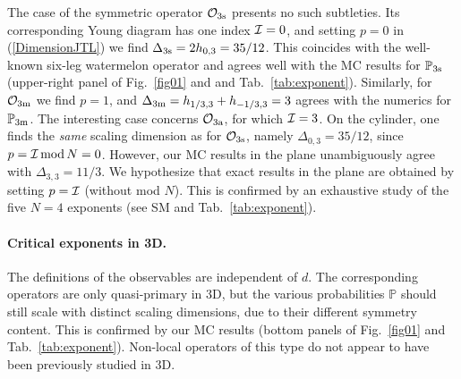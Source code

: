 \documentclass[aps,prl,twocolumn,showpacs,superscriptaddress,groupedaddress]{revtex4}  %
\def\bbp{{\mathbb P}}
\begin{document}
The case of the symmetric operator $\mathcal{O}_{3{\rm s}}$ presents no such subtleties.
Its corresponding Young diagram has one index ${\cal I} = 0$, and setting $p=0$ in (\ref{DimensionJTL}) we find $\Delta_{3{\rm s}}=2h_{0,3}=35/12$.
This coincides with the well-known six-leg watermelon operator \cite{SD87} and agrees well with the MC results for $\bbp_{3{\rm s}}$
(upper-right panel of Fig.~\eqref{fig01} and and Tab.~\ref{tab:exponent}).
Similarly, for $\mathcal{O}_{3{\rm m}}$ we find $p=1$, and $\Delta_{3{\rm m}}=h_{1/3,3}+h_{-1/3,3}=3$
agrees with the numerics for $\bbp_{3{\rm m}}$. The interesting case concerns $\mathcal{O}_{3{\rm a}}$, for which ${\cal I}=3$. 
On the cylinder, one finds the {\em same} scaling dimension as for $\mathcal{O}_{3{\rm s}}$, namely $\Delta_{0,3} = 35/12$,
since $p = {\cal I} \, \mbox{mod} \, N = 0$. However, our MC results in the plane unambiguously agree with $\Delta_{3,3} = 11/3$.
We hypothesize that exact results in the plane are obtained by setting $p = {\cal I}$ (without mod $N$). This is confirmed by
 an exhaustive study of the five $N=4$ exponents (see SM and Tab.~\ref{tab:exponent}).


\paragraph{Critical exponents in 3D.}

The definitions of the observables are independent of $d$. The corresponding operators are only quasi-primary in 3D,
but the various probabilities $\bbp$ should still scale with distinct scaling dimensions, due to their different symmetry content.
This is confirmed by our MC results (bottom panels of Fig.~\eqref{fig01} and Tab.~\ref{tab:exponent}).
Non-local operators of this type do not appear to have been previously studied in 3D.
\end{document}
